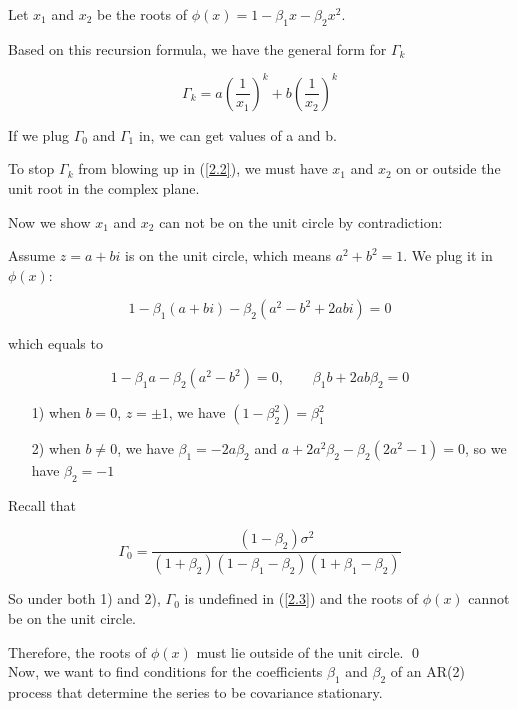 \documentclass[11pt]{article}
\begin{document}
Let $x_1$ and $x_2$ be the roots of $\phi(x)=1-\beta_1x-\beta_2x^2$. 

Based on this recursion formula, we have the general form for $\Gamma_k$

\begin{equation}\label{2.2}
\Gamma_k=a(\frac{1}{x_1})^k+b(\frac{1}{x_2})^k
\end{equation}

If we plug $\Gamma_0$ and $\Gamma_1$ in, we can get values of a and b.

To stop $\Gamma_k$ from blowing up in (\ref{2.2}), we must have $x_1$ and $x_2$ on or outside the unit root in the complex plane.\\ 
\medskip

Now we show $x_1$ and $x_2$ can not be on the unit circle by contradiction:

\setlength{\leftskip}{2cm} 
Assume $z=a+bi$ is on the unit circle, which means $a^2+b^2=1$. We plug it in $\phi(x)$:

$$
1-\beta_1(a+bi)-\beta_2(a^2-b^2+2abi)=0
$$

which equals to

$$
1-\beta_1a-\beta_2(a^2-b^2)=0,\qquad\beta_1b+2ab\beta_2=0
$$
\begin{enumerate}\setlength{\leftskip}{2cm} 
\item[1)] when $b=0$, $z=\pm 1$, we have $(1-\beta_2^2)=\beta_1^2$
\item[2)] when $b\neq 0$, we have $\beta_1=-2a\beta_2$ and $a+2a^2\beta_2-\beta_2(2a^2-1)=0$, so we have $\beta_2=-1$
\end{enumerate}

Recall that

\begin{equation}\label{2.3}
\Gamma_0 = \frac{(1-\beta_2)\sigma^2}{(1+\beta_2)(1-\beta_1-\beta_2)(1+\beta_1-\beta_2)}
\end{equation}

So under both 1) and 2), $\Gamma_0$ is undefined in (\ref{2.3}) and the roots of $\phi(x)$ cannot be on the unit circle.

\setlength{\leftskip}{0pt} 

Therefore, the roots of $\phi(x)$ must lie outside of the unit circle. \qed\\ 

\medskip
\medskip
Now, we want to find conditions for the coefficients $\beta_{1}$ and $\beta_{2}$ of an AR(2) process that determine the series to be covariance stationary.
\end{document}

